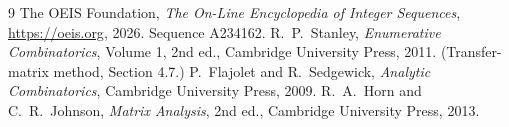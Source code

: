 \documentclass[11pt,a4paper]{article}
\theoremstyle{plain}
\theoremstyle{definition}
\begin{document}
\begin{thebibliography}{9}
 The OEIS Foundation, \emph{The On-Line Encyclopedia of Integer
Sequences}, \url{https://oeis.org}, 2026. Sequence A234162.
 R.~P.~Stanley, \emph{Enumerative Combinatorics}, Volume 1, 2nd ed.,
Cambridge University Press, 2011. (Transfer-matrix method, Section 4.7.)
 P.~Flajolet and R.~Sedgewick, \emph{Analytic Combinatorics}, Cambridge
University Press, 2009.
 R.~A.~Horn and C.~R.~Johnson, \emph{Matrix Analysis}, 2nd ed., Cambridge
University Press, 2013.
\end{thebibliography}
\end{document}
